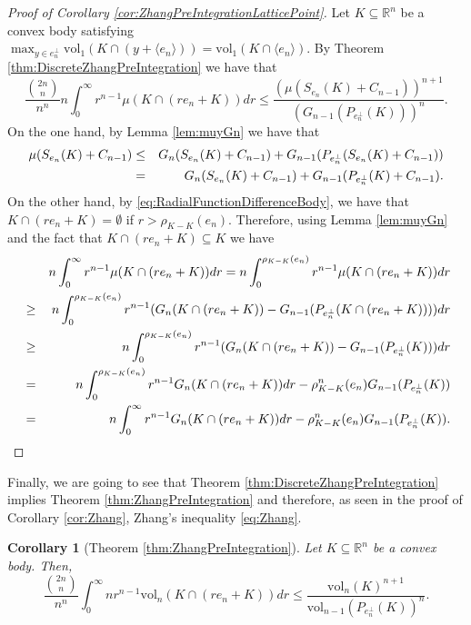 \documentclass[10pt]{amsart}
\newtheorem{cor}[thm]{Corollary}
\def\R{\mathbb{R}}
\def\vol{\mathrm{vol}}
\numberwithin{equation}{section}
\begin{document}
\begin{proof}[Proof of Corollary \ref{cor:ZhangPreIntegrationLatticePoint}]
Let $K\subseteq\R^n$ be a convex body satisfying \\$\displaystyle{\max_{y\in e_n^\perp}\vol_1(K\cap(y+\langle e_n\rangle))}=\vol_1(K\cap\langle e_n\rangle)$. By Theorem \ref{thm:DiscreteZhangPreIntegration} we have that
$$
\frac{{{2n}\choose{n}}}{n^n}n\int_0^\infty r^{n-1}\mu(K\cap(re_n+K))dr\leq\frac{(\mu(S_{e_n}(K)+C_{n-1}))^{n+1}}{(G_{n-1}(P_{e_n^\perp}(K)))^n}.
$$
On the one hand, by Lemma \ref{lem:muyGn} we have that
\begin{eqnarray*}
\mu(S_{e_n}(K)+C_{n-1})&\leq& G_n(S_{e_n}(K)+C_{n-1})+G_{n-1}(P_{e_n^\perp}(S_{e_n}(K)+C_{n-1}))\cr
&=&G_n(S_{e_n}(K)+C_{n-1})+G_{n-1}(P_{e_n^\perp}(K)+C_{n-1}).
\end{eqnarray*}
On the other hand, by \eqref{eq:RadialFunctionDifferenceBody}, we have that $K\cap(re_n+K)=\emptyset$ if $r>\rho_{K-K}(e_n)$. Therefore, using Lemma \ref{lem:muyGn} and the fact that $K\cap(re_n+K)\subseteq K$ we have
\begin{eqnarray*}
&&n\int_0^\infty r^{n-1}\mu(K\cap(re_n+K))dr=n\int_0^{\rho_{K-K}(e_n)} r^{n-1}\mu(K\cap(re_n+K))dr\cr
&\geq&n\int_0^{\rho_{K-K}(e_n)} r^{n-1}(G_n(K\cap(re_n+K))-G_{n-1}(P_{e_n^\perp}(K\cap(re_n+K))))dr\cr
&\geq&n\int_0^{\rho_{K-K}(e_n)} r^{n-1}(G_n(K\cap(re_n+K))-G_{n-1}(P_{e_n^\perp}(K)))dr\cr
&=&n\int_0^{\rho_{K-K}(e_n)} r^{n-1}G_n(K\cap(re_n+K))dr-\rho_{K-K}^n(e_n)G_{n-1}(P_{e_n^\perp}(K))\cr
&=&n\int_0^{\infty} r^{n-1}G_n(K\cap(re_n+K))dr-\rho_{K-K}^n(e_n)G_{n-1}(P_{e_n^\perp}(K)).\cr
\end{eqnarray*}
\end{proof}


Finally, we are going to see that Theorem \ref{thm:DiscreteZhangPreIntegration} implies Theorem \ref{thm:ZhangPreIntegration} and therefore, as seen in the proof of Corollary \ref{cor:Zhang}, Zhang's inequality \eqref{eq:Zhang}.

\begin{cor}[Theorem \ref{thm:ZhangPreIntegration}]\label{cor:DiscreteToContinuous}
Let $K\subseteq\R^n$ be a convex body. Then,
$$
\frac{{{2n}\choose{n}}}{n^n}\int_0^\infty nr^{n-1}\vol_n(K\cap(re_n+ K))dr\leq\frac{\vol_n(K)^{n+1}}{\vol_{n-1}(P_{e_n^\perp}(K))^n}.
$$
\end{cor}
\end{document}
